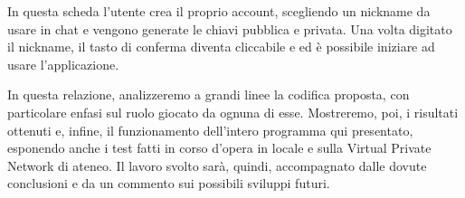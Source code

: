 In questa scheda l'utente crea il proprio account, scegliendo un nickname da usare in chat
e vengono generate le chiavi pubblica e privata. Una volta digitato il nickname, il tasto
di conferma diventa cliccabile e ed è possibile iniziare ad usare l'applicazione.

In questa relazione, analizzeremo a grandi linee la codifica proposta,
con particolare enfasi sul ruolo giocato da ognuna di esse.
Mostreremo, poi, i risultati ottenuti e, infine,
il funzionamento dell'intero programma qui presentato,
esponendo anche i test fatti in corso d'opera
in locale e sulla Virtual Private Network di ateneo.
Il lavoro svolto sarà, quindi, accompagnato dalle dovute conclusioni e
da un commento sui possibili sviluppi futuri.